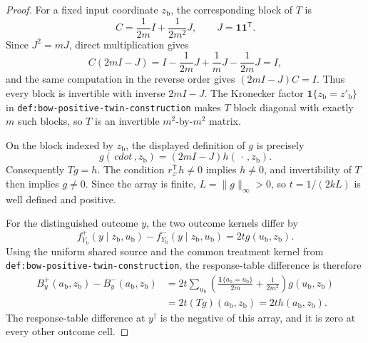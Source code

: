 \documentclass{article}
\begin{document}
\begin{proof}
For a fixed input coordinate \(z_{\mathrm b}\), the corresponding block of \(T\) is
\[
 C=\frac{1}{2m}I+\frac{1}{2m^2}J,
 \qquad J=\mathbf 1\mathbf 1^{\mathsf T}.
\]
Since \(J^2=mJ\), direct multiplication gives
\[
 C(2mI-J)
 =I-\frac{1}{2m}J+\frac{1}{m}J-\frac{1}{2m}J=I,
\]
and the same computation in the reverse order gives \((2mI-J)C=I\).  Thus every block is invertible with inverse \(2mI-J\).  The Kronecker factor \(\mathbf 1\{z_{\mathrm b}=z'_{\mathrm b}\}\) in \texttt{def:bow-positive-twin-construction} makes \(T\) block diagonal with exactly \(m\) such blocks, so \(T\) is an invertible \(m^2\)-by-\(m^2\) matrix.

On the block indexed by \(z_{\mathrm b}\), the displayed definition of \(g\) is precisely
\[
 g(\,cdot\,,z_{\mathrm b})=(2mI-J)h(\,\cdot\,,z_{\mathrm b}).
\]
Consequently \(Tg=h\).  The condition \(r_{z^{\circ}}^{\mathsf T}h\ne0\) implies \(h\ne0\), and invertibility of \(T\) then implies \(g\ne0\).  Since the array is finite, \(L=\lVert g\rVert_\infty>0\), so \(t=1/(2kL)\) is well defined and positive.

For the distinguished outcome \(y\), the two outcome kernels differ by
\[
 f^+_{Y_{\mathrm b}}(y\mid z_{\mathrm b},u_{\mathrm b})
 -f^-_{Y_{\mathrm b}}(y\mid z_{\mathrm b},u_{\mathrm b})
 =2t g(u_{\mathrm b},z_{\mathrm b}).
\]
Using the uniform shared source and the common treatment kernel from \texttt{def:bow-positive-twin-construction}, the response-table difference is therefore
\[
\begin{aligned}
 B_y^+(a_{\mathrm b},z_{\mathrm b})-B_y^-(a_{\mathrm b},z_{\mathrm b})
 &=2t\sum_{u_{\mathrm b}}
 \left(\frac{\mathbf 1\{a_{\mathrm b}=u_{\mathrm b}\}}{2m}
 +\frac{1}{2m^2}\right)g(u_{\mathrm b},z_{\mathrm b})\\
 &=2t(Tg)(a_{\mathrm b},z_{\mathrm b})
 =2t h(a_{\mathrm b},z_{\mathrm b}).
\end{aligned}
\]
The response-table difference at \(y^{\dagger}\) is the negative of this array, and it is zero at every other outcome cell.


\end{proof}
\end{document}

